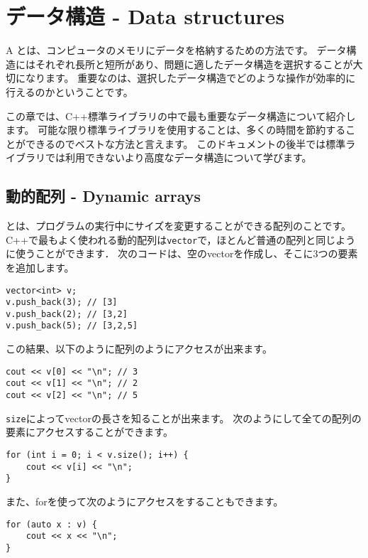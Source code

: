 \chapter{データ構造 - Data structures}


A とは、コンピュータのメモリにデータを格納するための方法です。
データ構造にはそれぞれ長所と短所があり、問題に適したデータ構造を選択することが大切になります。
重要なのは、選択したデータ構造でどのような操作が効率的に行えるのかということです。

この章では、C++標準ライブラリの中で最も重要なデータ構造について紹介します。
可能な限り標準ライブラリを使用することは、多くの時間を節約することができるのでベストな方法と言えます。
このドキュメントの後半では標準ライブラリでは利用できないより高度なデータ構造について学びます。

\section{動的配列 - Dynamic arrays}


とは、プログラムの実行中にサイズを変更することができる配列のことです。
C++で最もよく使われる動的配列は\texttt{vector}で，ほとんど普通の配列と同じように使うことができます．
次のコードは、空のvectorを作成し、そこに3つの要素を追加します。

\begin{lstlisting}
vector<int> v;
v.push_back(3); // [3]
v.push_back(2); // [3,2]
v.push_back(5); // [3,2,5]
\end{lstlisting}

この結果、以下のように配列のようにアクセスが出来ます。

\begin{lstlisting}
cout << v[0] << "\n"; // 3
cout << v[1] << "\n"; // 2
cout << v[2] << "\n"; // 5
\end{lstlisting}

\texttt{size}によってvectorの長さを知ることが出来ます。
次のようにして全ての配列の要素にアクセスすることができます。

\begin{lstlisting}
for (int i = 0; i < v.size(); i++) {
    cout << v[i] << "\n";
}
\end{lstlisting}

\begin{samepage}

また、forを使って次のようにアクセスをすることもできます。
    
\begin{lstlisting}
for (auto x : v) {
    cout << x << "\n";
}
\end{lstlisting}
\end{samepage}

